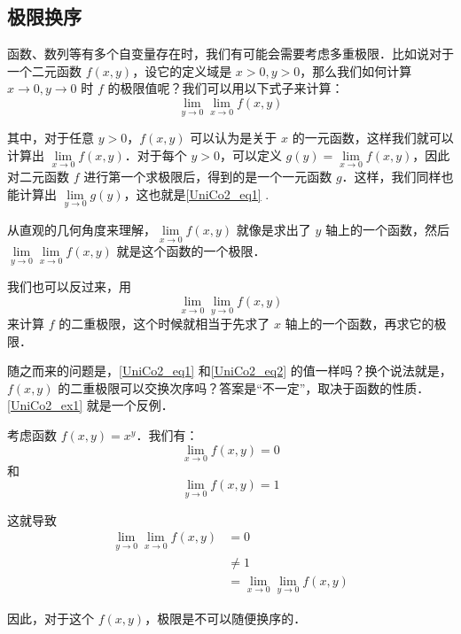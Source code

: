 

\subsection{极限换序}

函数、数列等有多个自变量存在时，我们有可能会需要考虑多重极限．比如说对于一个二元函数 $f(x, y)$，设它的定义域是 $x>0, y>0$，那么我们如何计算 $x\to 0, y\to 0$ 时 $f$ 的极限值呢？我们可以用以下式子来计算：
\begin{equation}\label{UniCo2_eq1}
\lim\limits_{y\to 0}\lim\limits_{x\to 0}f(x, y)
\end{equation}

其中，对于任意 $y>0$，$f(x, y)$ 可以认为是关于 $x$ 的一元函数，这样我们就可以计算出 $\lim\limits_{x\to 0}f(x, y)$．对于每个 $y>0$，可以定义 $g(y)=\lim\limits_{x\to 0}f(x, y)$，因此对二元函数 $f$ 进行第一个求极限后，得到的是一个一元函数 $g$．这样，我们同样也能计算出 $\lim\limits_{y\to 0}g(y)$，这也就是\autoref{UniCo2_eq1} .

从直观的几何角度来理解，$\lim\limits_{x\to 0}f(x, y)$ 就像是求出了 $y$ 轴上的一个函数，然后 $\lim\limits_{y\to 0}\lim\limits_{x\to 0}f(x, y)$ 就是这个函数的一个极限．

我们也可以反过来，用
\begin{equation}\label{UniCo2_eq2}
\lim\limits_{x\to 0}\lim\limits_{y\to 0}f(x, y)
\end{equation}
来计算 $f$ 的二重极限，这个时候就相当于先求了 $x$ 轴上的一个函数，再求它的极限．

随之而来的问题是，\autoref{UniCo2_eq1} 和\autoref{UniCo2_eq2} 的值一样吗？换个说法就是，$f(x, y)$ 的二重极限可以交换次序吗？答案是“不一定”，取决于函数的性质．\autoref{UniCo2_ex1} 就是一个反例．

\begin{example}{}\label{UniCo2_ex1}
考虑函数 $f(x, y)=x^y$．我们有：
\begin{equation}
\lim\limits_{x\to 0}f(x, y)=0
\end{equation}
和
\begin{equation}
\lim\limits_{y\to 0}f(x, y)=1
\end{equation}

这就导致
\begin{equation}
\begin{aligned}
\lim\limits_{y\to 0}\lim\limits_{x\to 0}f(x, y)&=0\\
&\not = 1\\
&=\lim\limits_{x\to 0}\lim\limits_{y\to 0}f(x, y)
\end{aligned}
\end{equation}

因此，对于这个 $f(x, y)$，极限是不可以随便换序的．

\end{example}



